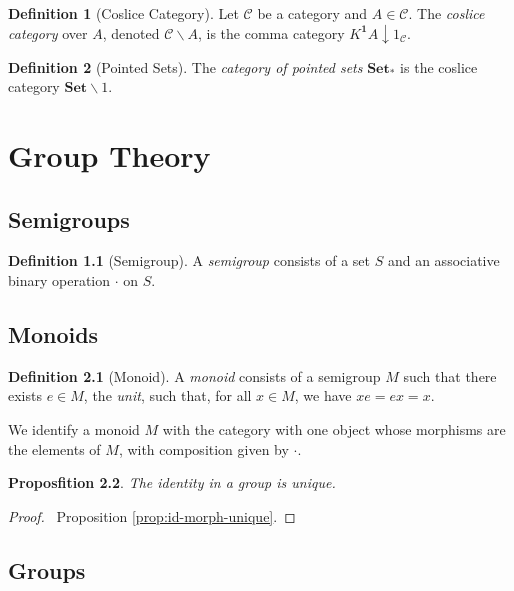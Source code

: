\documentclass{book}
\newtheorem{prop}{Proposfition}[chapter]
\theoremstyle{definition}
\newtheorem{df}[prop]{Definition}
\newcommand{\Set}{\ensuremath{\mathbf{Set}}}
\begin{document}
\begin{df}[Coslice Category]
    Let $\mathcal{C}$ be a category and $A \in \mathcal{C}$. The \emph{coslice category} over $A$, denoted $\mathcal{C} \backslash A$, is the comma category $K^{\mathbf{1}} A \downarrow 1_\mathcal{C}$.
\end{df}

\begin{df}[Pointed Sets]
    The \emph{category of pointed sets} $\Set_*$ is the coslice category $\Set \backslash 1$.
\end{df}

\part{Group Theory}

\chapter{Semigroups}

\begin{df}[Semigroup]
A \emph{semigroup} consists of a set $S$ and an associative binary operation $\cdot$ on $S$.
\end{df}

\chapter{Monoids}

\begin{df}[Monoid]
A \emph{monoid} consists of a semigroup $M$ such that there exists $e \in M$, the \emph{unit}, such that, for all $x \in M$, we have $x e = ex = x$.

We identify a monoid $M$ with the category with one object whose morphisms are the elements of $M$, with composition given by $\cdot$.
\end{df}

\begin{prop}
    The identity in a group is unique.
\end{prop}

\begin{proof}
    \pf\ Proposition \ref{prop:id-morph-unique}.
\end{proof}

\chapter{Groups}
\end{document}
